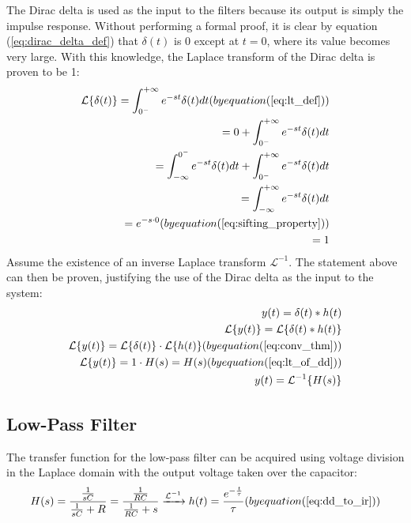 The Dirac delta is used as the input to the filters because its output is simply the impulse response. Without performing a formal proof, it is clear by equation (\ref{eq:dirac_delta_def}) that $\delta(t)$ is 0 except at $t = 0$, where its value becomes very large. With this knowledge, the Laplace transform of the Dirac delta is proven to be 1:
\begin{equation*}
	\label{eq:lt_of_dd}
	\begin{aligned}
		\mathcal{L}\{\delta(t)\} = \int_{0^{-}}^{+\infty} e^{-st}\delta(t)dt ( by equation (\ref{eq:lt_def}) ) \\
				       = 0 + \int_{0^{-}}^{+\infty} e^{-st}\delta(t)dt \\
				       = \int_{-\infty}^{0^{-}} e^{-st}\delta(t)dt + \int_{0^{-}}^{+\infty} e^{-st}\delta(t)dt \\
				       = \int_{-\infty}^{+\infty} e^{-st}\delta(t)dt \\
				       = e^{-s \cdot 0} ( by equation (\ref{eq:sifting_property}) ) \\
				       = 1
	\end{aligned}
\end{equation*}
Assume the existence of an inverse Laplace transform $\mathcal{L}^{-1}$. The statement above can then be proven, justifying the use of the Dirac delta as the input to the system:
\begin{equation*}
	\label{eq:dd_to_ir}
	\begin{aligned}
		y(t) = \delta(t) * h(t) \\
		\mathcal{L}\{y(t)\} = \mathcal{L}\{\delta(t) * h(t)\} \\
		\mathcal{L}\{y(t)\} = \mathcal{L}\{\delta(t)\} \cdot \mathcal{L}\{h(t)\} ( by equation (\ref{eq:conv_thm}) ) \\
		\mathcal{L}\{y(t)\} = 1 \cdot H(s) = H(s) ( by equation (\ref{eq:lt_of_dd}) ) \\
		y(t) = \mathcal{L}^{-1}\{H(s)\}
	\end{aligned}
\end{equation*}

\subsection{Low-Pass Filter}
The transfer function for the low-pass filter can be acquired using voltage division in the Laplace domain with the output voltage taken over the capacitor:
\begin{equation}
	\label{eq:tf_lpf}
	H(s) = \frac{ \frac{ 1 }{ sC } }{ \frac{ 1 }{ sC } + R } = \frac{ \frac{ 1 }{ RC } }{ \frac{ 1 }{ RC } + s } \xrightarrow{\mathcal{L}^{-1}} h(t) = \frac{ e^{-\frac{t}{\tau}} }{ \tau } ( by equation (\ref{eq:dd_to_ir}) )
\end{equation}

